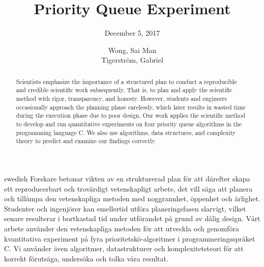 \documentclass[a4paper,11pt]{kth-mag}
\title{Priority Queue Experiment}
\subtitle{December 5, 2017}
\author{Wong, Sai Man\\ Tigerstr\"{o}m, Gabriel}
\date{}
\begin{document}
\frontmatter
\pagestyle{empty}
\removepagenumbers
\maketitle
{}

\begin{abstract}
    Scientists emphasize the importance of a structured plan to conduct a reproducible and credible scientific work subsequently.
    That is, to plan and apply the scientific method with rigor, transparency, and honesty.
    However, students and engineers occasionally approach the planning phase carelessly, which later results in wasted time during the execution phase due to poor design.
    Our work applies the scientific method to develop and run quantitative experiments on four priority queue algorithms in the programming language C.
    We also use algorithms, data structures, and complexity theory to predict and examine our findings correctly.
\end{abstract}
\clearpage

\begin{foreignabstract}{swedish}
    Forskare betonar vikten av en strukturerad plan f\"{o}r att d\"{a}refter skapa ett reproducerbart och trov\"{a}rdigt vetenskapligt arbete, det vill s\"{a}ga att planera och till\"{a}mpa den vetenskapliga metoden med noggrannhet, \"{o}ppenhet och \"{a}rlighet.
    Studenter och ingenj\"{o}rer kan emellertid utf\"{o}ra planeringsfasen slarvigt, vilket senare resulterar i bortkastad tid under utf\"{o}randet p\r{a} grund av d\r{a}lig design.
    V\r{a}rt arbete anv\"{a}nder den vetenskapliga metoden f\"{o}r att utveckla och genomf\"{o}ra kvantitativa experiment p\r{a} fyra prioritetsk\"{o}-algoritmer i programmeringsspr\r{a}ket C.
    Vi anv\"{a}nder \"{a}ven algoritmer, datastrukturer och komplexitetsteori f\"{o}r att korrekt f\"{o}ruts\"{a}ga, unders\"{o}ka och tolka v\r{a}ra resultat.
\end{foreignabstract}
\clearpage
\end{document}
